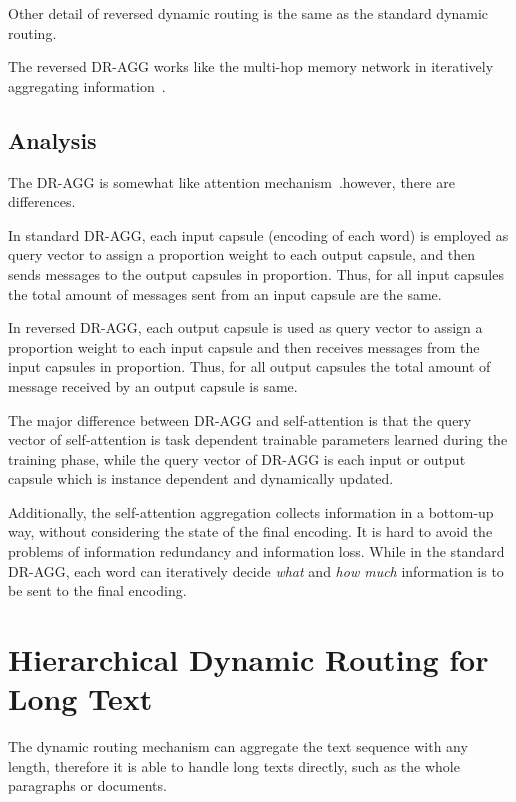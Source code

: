 \documentclass[11pt]{article}
\begin{document}
Other detail of reversed dynamic routing is the same as the standard dynamic routing.

The reversed DR-AGG works like the multi-hop memory network in iteratively aggregating information~\cite{sukhbaatar2015end,kumar2015ask}. 

\subsection{Analysis}

The DR-AGG is somewhat like attention mechanism~\cite{bahdanau2014neural,DBLP:conf/nips/VaswaniSPUJGKP17}.however, there are differences.

In standard DR-AGG, each input capsule (encoding of each word) is employed as query vector to assign a proportion weight to each output capsule, and then sends messages to the output capsules in proportion. Thus, for all input capsules the total amount of messages sent from an input capsule are the same.


In reversed DR-AGG, each output capsule is used as query vector to assign a proportion weight to each input capsule and then receives messages from the input capsules in proportion. Thus, for all output capsules the total amount of message received by an output capsule is same.

The major difference between DR-AGG and self-attention \cite{lin2017structured,yang2016hierarchical} is that the query vector of self-attention is task dependent trainable parameters learned during the training phase, while the query vector of DR-AGG is each input or output capsule which is instance dependent and dynamically updated.

Additionally, the self-attention aggregation collects information in a bottom-up way, without considering the state of the final encoding. It is hard to avoid the problems of information redundancy and information loss.
While in the standard DR-AGG, each word can iteratively decide \textit{what} and \textit{how much} information is to be sent to the final encoding.


\section{Hierarchical Dynamic Routing for Long Text}

The dynamic routing mechanism can aggregate the text sequence with any length, therefore it is able to handle long texts directly, such as the whole paragraphs or documents.
\end{document}
